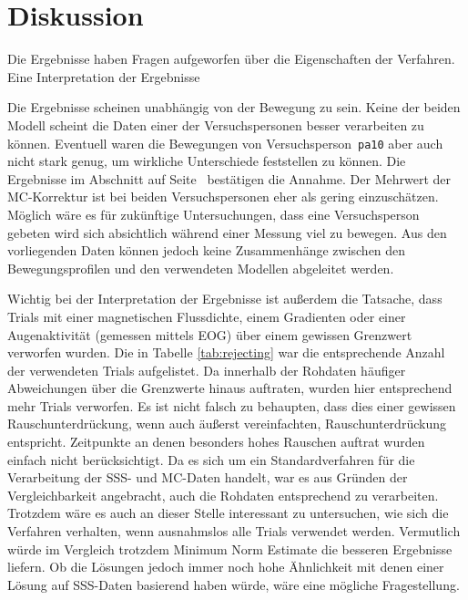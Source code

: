 \documentclass[doc,a4paper,12pt]{apa6}
\makeatletter
\DeclareRobustCommand*{\nameref}[1]{%
      \glqq{\myorg@nameref{#1}}\grqq%
    }%
\makeatother
\begin{document}

\newpage

\section{Diskussion}
\label{sec:diskussion}

Die Ergebnisse haben Fragen aufgeworfen über die Eigenschaften der Verfahren. Eine Interpretation der Ergebnisse 


Die Ergebnisse scheinen unabhängig von der Bewegung zu sein. Keine der beiden Modell scheint die Daten einer der Versuchspersonen besser verarbeiten zu können. Eventuell waren die Bewegungen von Versuchsperson~\texttt{pa10} aber auch nicht stark genug, um wirkliche Unterschiede feststellen zu können. Die Ergebnisse im Abschnitt \nameref{sec:ergebnis-vorverarbeitung} auf Seite~\pageref{sec:ergebnis-vorverarbeitung} bestätigen die Annahme. Der Mehrwert der MC-Korrektur ist bei beiden Versuchspersonen eher als gering einzuschätzen. Möglich wäre es für zukünftige Untersuchungen, dass eine Versuchsperson gebeten wird sich absichtlich während einer Messung viel zu bewegen. Aus den vorliegenden Daten können jedoch keine Zusammenhänge zwischen den Bewegungsprofilen und den verwendeten Modellen abgeleitet werden.

Wichtig bei der Interpretation der Ergebnisse ist außerdem die Tatsache, dass Trials mit einer magnetischen Flussdichte, einem Gradienten oder einer Augenaktivität (gemessen mittels EOG) über einem gewissen Grenzwert verworfen wurden. Die in Tabelle \ref{tab:rejecting} war die entsprechende Anzahl der verwendeten Trials aufgelistet. Da innerhalb der Rohdaten häufiger Abweichungen über die Grenzwerte hinaus auftraten, wurden hier entsprechend mehr Trials verworfen. Es ist nicht falsch zu behaupten, dass dies einer gewissen Rauschunterdrückung, wenn auch äußerst vereinfachten, Rauschunterdrückung entspricht. Zeitpunkte an denen besonders hohes Rauschen auftrat wurden einfach nicht berücksichtigt. Da es sich um ein Standardverfahren für die Verarbeitung der SSS- und MC-Daten handelt, war es aus Gründen der Vergleichbarkeit angebracht, auch die Rohdaten entsprechend zu verarbeiten. Trotzdem wäre es auch an dieser Stelle interessant zu untersuchen, wie sich die Verfahren verhalten, wenn ausnahmslos alle Trials verwendet werden. Vermutlich würde im Vergleich trotzdem Minimum Norm Estimate die besseren Ergebnisse liefern. Ob die Lösungen jedoch immer noch hohe Ähnlichkeit mit denen einer Lösung auf SSS-Daten basierend haben würde, wäre eine mögliche Fragestellung.
\end{document}
